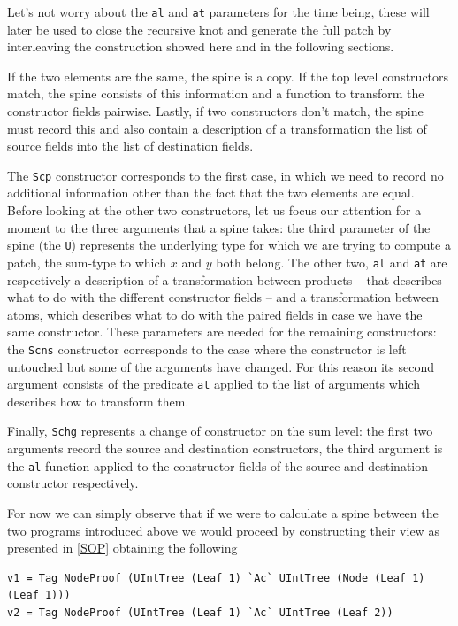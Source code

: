 \documentclass[11pt, titlepage]{article}
\begin{document}
Let's not worry about the \texttt{al} and \texttt{at} parameters for the time 
being, these will later be used to close the recursive knot and generate the full patch by interleaving
the construction showed here and in the following sections. 

If the two elements are the same, the spine is a copy. If the top level constructors match, the spine consists of this information and a function to transform the constructor fields pairwise. Lastly, if two constructors don't match, the spine must record this and also contain a description of a transformation the list of source fields into the list of destination fields.

The \texttt{Scp} constructor corresponds to the first case, in which we need
to record no additional information other than the fact that the two
elements are equal. 
Before looking at the other two constructors, let us focus our attention for a moment to the three arguments that a spine takes:
the third parameter of the spine (the \texttt{U}) represents the
underlying type for which we are trying to compute a patch, the sum-type to which $x$ and $y$ both belong.
The other two, \texttt{al} and \texttt{at} are respectively a
description of a transformation between products -- that describes what to do with the different
constructor fields -- and a transformation between atoms, which describes what to
do with the paired fields in case we have the same constructor.
These parameters are needed for the remaining constructors: the \texttt{Scns} constructor corresponds to the  case where the constructor is left untouched but some of the arguments have changed.
For this reason its second argument consists of the predicate \texttt{at} applied to the list of arguments which describes how to transform them. 

Finally, \texttt{Schg} represents a change of constructor on the sum level: the first two arguments record the
source and destination constructors, the third argument is the
\texttt{al} function applied to the constructor fields of the source and
destination constructor respectively.

For now we can simply observe that if we were to calculate a spine between the 
two programs introduced above we would proceed by constructing their view as 
presented in \ref{SOP} obtaining the following

\begin{verbatim}
v1 = Tag NodeProof (UIntTree (Leaf 1) `Ac` UIntTree (Node (Leaf 1) (Leaf 1)))
v2 = Tag NodeProof (UIntTree (Leaf 1) `Ac` UIntTree (Leaf 2))
\end{verbatim}
\end{document}
